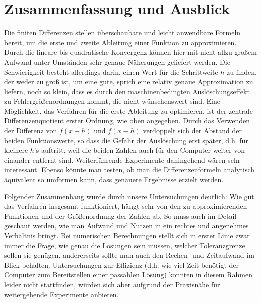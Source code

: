 \documentclass{scrartcl}
\begin{document}
\pagebreak \section{Zusammenfassung und Ausblick}
\label{sec:zusammenfassung}
Die finiten Differenzen stellen überschaubare und leicht anwendbare Formeln bereit, um die erste und zweite Ableitung einer Funktion zu approximieren.
Durch die lineare bis quadratische Konvergenz können hier mit nicht allzu großem Aufwand unter Umständen sehr genaue Näherungen geliefert werden.
Die Schwierigkeit besteht allerdings darin, einen Wert für die Schrittweite $h$ zu finden, der weder zu groß ist, um eine gute, sprich eine relativ genaue Approximation zu liefern, noch so klein, dass es durch den maschinenbedingten Auslöschungseffekt zu Fehlergrößenordnungen kommt, die nicht wünschenswert sind.
Eine Möglichkeit, das Verfahren für die erste Ableitung zu optimieren, ist der zentrale Differenzenquotient erster Ordnung, wie oben angegeben. Durch das Verwenden der Differenz von $f(x+h)$ und $f(x-h)$ verdoppelt sich der Abstand der beiden Funktionswerte, so dass die Gefahr der Auslöschung erst später, d.h. für kleinere $h$'s auftritt, weil die beiden Zahlen auch für den Computer weiter von einander entfernt sind.
Weiterführende Experimente dahingehend wären sehr interessant.
Ebenso könnte man testen, ob man die Differenzenformeln analytisch äquivalent so umformen kann, dass genauere Ergebnisse erzielt werden.

Folgender Zusammenhang wurde durch unsere Untersuchungen deutlich:
Wie gut das Verfahren insgesamt funktioniert, hängt sehr von den zu approximierenden Funktionen und der Größenordnung der Zahlen ab.
So muss auch im Detail geschaut werden, wie man Aufwand und Nutzen in ein rechtes und angenehmes Verhältnis bringt.
Bei numerischen Berechnungen stellt sich in erster Linie zwar immer die Frage, wie genau die Lösungen sein müssen, welcher Toleranzgrenze sollen sie genügen, andererseits sollte man auch den Rechen- und Zeitaufwand im Blick behalten.
Untersuchungen zur Effizienz (d.h. wie viel Zeit benötigt der Computer zum Bereitstellen einer passablen Lösung) konnten in diesem Rahmen leider nicht stattfinden, würden sich aber aufgrund der Praxisnähe für weitergehende Experimente anbieten.

\pagebreak


\end{document}
